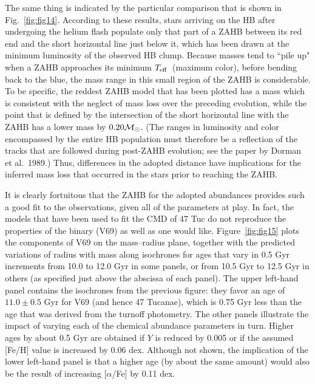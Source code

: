 \documentclass[12pt,preprint]{aastex}
\newcommand\teff{{T_{\rm eff}}}
\begin{document}
The same thing is indicated by the particular comparison that is shown in
Fig.~\ref{fig:fig14}.  According to these results, stars arriving on the HB
after undergoing the helium flash populate
only that part of a ZAHB between its red end and the
short horizontal line just below it, which has been drawn at the minimum
luminosity of the observed HB clump.  Because masses tend to ``pile up" when
a ZAHB approaches its minimum $\teff$\ (maximum color), before bending back to
the blue, the mass range in this small region of the ZAHB is considerable.  To
be specific, the reddest ZAHB model that has been plotted has a mass which is
consistent with the neglect of mass loss over the preceding evolution, while the
point that is defined by the intersection of the short horizontal line with the
ZAHB has a lower mass by $0.20 {{\cal M}_\odot}$.  (The ranges in luminosity and
color encompassed by the entire HB population must therefore be a reflection of
the tracks that are followed during post-ZAHB evolution; see the paper by
Dorman et al.~1989.)  Thus, differences in the adopted distance have implications
for the inferred mass loss that occurred in the stars prior to reaching the
ZAHB.

It is clearly fortuitous that the ZAHB for the adopted abundances provides such
a good fit to the observations, given all of the parameters at play. In fact,
the models that have been used to fit the CMD of 47 Tuc do not reproduce the
properties of the binary (V69) as well as one would like. Figure~\ref{fig:fig15}
plots the components of V69 on the mass--radius plane, together with the
predicted variations of radius with mass along isochrones for ages that vary in
0.5 Gyr increments from 10.0 to 12.0 Gyr in some panels, or from 10.5 Gyr to
12.5 Gyr in others (as specified just above the abscissa of each panel).  The
upper left-hand panel contains the isochrones from the previous figure: they
favor an age of $11.0 \pm 0.5$ Gyr for V69 (and hence 47 Tucanae), which is
0.75 Gyr less than the age that was derived from the turnoff photometry.  The
other panels illustrate the impact of varying each of the chemical abundance
parameters in turn.  Higher ages by about 0.5 Gyr are obtained if $Y$ is reduced
by 0.005 or if the assumed [Fe/H] value is increased by 0.06 dex.  Although not
shown, the implication of the lower left-hand panel is that a higher age (by
about the same amount) would also be the result of increasing [$\alpha$/Fe] by
0.11 dex.
\end{document}
